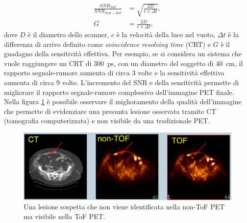 \begin{equation}
	\begin{split}
		\frac{SNR_{ToF}}{SNR_{Non-ToF}}&=\sqrt{\frac{2D}{c \times \Delta t}}, \\
		G&=\frac{2D}{c\times\Delta t},
	\end{split}
\end{equation}
dove $D$ è il diametro dello scanner, $c$ è la velocità della luce nel vuoto, $\Delta t$ è la differenza di arrivo definito come \textit{coincidence resolving time} (CRT) e $G$ è il guadagno della sensitività  effettiva. Per esempio, se si considera un sistema che vuole raggiungere un CRT di \SI{300}{\pico\second}, con un diametro del soggetto di \SI{40}{\centi\meter}, il rapporto segnale-rumore aumenta di circa 3 volte e la sensitività effettiva aumenta di circa 9 volte. L'incremento del SNR e della sensitività permette di migliorare il rapporto segnale-rumore complessivo dell'immagine PET finale. Nella figura \ref{fig:tof_image} è possibile osservare il miglioramento della qualità dell'immagine che permette di evidenziare una presunta lesione osservata tramite CT (tomografia computerizzata) e non visibile da una tradizionale PET.
\begin{figure}[tbh]
	\centering
	\includegraphics[width=\linewidth]{./ImageFiles/tof_image.jpg}
	\caption{Una lesione sospetta che non viene identificata nella non-ToF PET ma visibile nella ToF PET\cite{Karp2006}.}
	\label{fig:tof_image}
\end{figure}
















